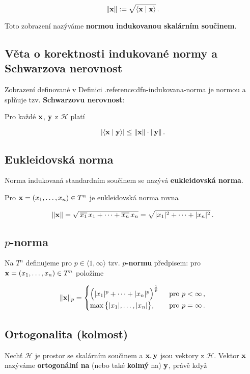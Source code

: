 \[ \|\mathbf{x}\|:=\sqrt{\langle\mathbf{x}\mid\mathbf{x}\rangle}\,. \]

\noindent Toto zobrazení nazýváme \textbf{normou indukovanou skalárním součinem}.

\subsection*{Věta o korektnosti indukované normy a Schwarzova nerovnost}

Zobrazení definované v Definici .reference:dfn-indukovana-norma je normou a
splňuje tzv. \textbf{Schwarzovu nerovnost}:

Pro každé $\mathbf{x}$, $\mathbf{y}$ z $\mathcal H$ platí

\[ |\langle\mathbf{x}\mid\mathbf{y}\rangle|\leq \|\mathbf{x}\|\cdot\|\mathbf{y}\|\,. \]

\subsection*{Eukleidovská norma}

Norma indukovaná standardním součinem se nazývá \textbf{eukleidovská norma}.

Pro $\mathbf{x}=(x_1,\dots,x_n)\in T^n$ je eukleidovská norma rovna

\[ \|\mathbf{x}\|=\sqrt{\,\overline{x_1}\,x_1+\dots+\overline{x_n}\,x_n}=\sqrt{|x_1|^2+\dots+|x_n|^2}\,. \]

\subsection*{$p$-norma}

Na $T^n$ definujeme pro $p\in \langle 1,\infty\rangle$ tzv. \textbf{$p$-normu}
předpisem: pro $\mathbf{x}=(x_1,\dots,x_n)\in T^n$ položíme

\[ \|\mathbf{x}\|_p=\begin{cases}
        \Big(|x_1|^p+\dots+|x_n|^p\Big)^{\frac{1}{p}}\, & \text{ pro }p < \infty\,, \\
        \max\big\{|x_1|,\dots,|x_n|\big\},              & \text{ pro }p= \infty\,.
    \end{cases} \]

\subsection*{Ortogonalita (kolmost)}

Nechť $\mathcal{H}$ je prostor se skalárním součinem a $\mathbf{x},\mathbf{y}$ jsou vektory z
$\mathcal{H}$. Vektor $\mathbf{x}$ nazýváme \textbf{ortogonální na} (nebo také
\textbf{kolmý} na) $\mathbf{y}$, právě když


